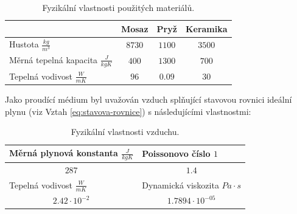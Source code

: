             \renewcommand{\arraystretch}{2}
            \begin{table}[ht!]
                \centering
                \caption{Fyzikální vlastnosti použitých materiálů.}
                \begin{tabular}{l|l|l|l}
                                                                                  & Mosaz                        & Pryž                        &  Keramika                      \\ \hline
                    Hustota $\unit{\frac{kg}{m^3}}$                               & \multicolumn{1}{c|}{$8730$}  & \multicolumn{1}{c|}{$1100$} & \multicolumn{1}{c}{$3500$}     \\ \hline
                    Měrná tepelná kapacita $\unit{\frac{J}{kg K}}$          & \multicolumn{1}{c|}{$400$}   & \multicolumn{1}{c|}{$1300$} & \multicolumn{1}{c}{$700$}      \\ \hline
                    Tepelná vodivost $\unit{\frac{W}{m K}}$                 & \multicolumn{1}{c|}{$96$}    & \multicolumn{1}{c|}{$0.09$} & \multicolumn{1}{c}{$30$}      
                \end{tabular}%
                \label{tab:materialy}
            \end{table}
            
            Jako proudící médium byl uvažován vzduch splňující stavovou rovnici ideální plynu (viz Vztah \ref{eq:stavova-rovnice}) s následujícími vlastnostmi:

		\begin{table}[ht!]
			\centering
            \caption{Fyzikální vlastnosti vzduchu.}
			\begin{tabular}{l|l}
				Měrná plynová konstanta $\unit{\frac{J}{kg K}}$ & Poissonovo číslo $\unit{1}$ \\ \hline
				\multicolumn{1}{c|}{$287$}                                                                        & \multicolumn{1}{c}{$1.4$}                \\ \hline
				Tepelná vodivost $\unit{\frac{W}{m K}}$ & Dynamická viskozita $\unit{Pa \cdot s}$ \\ \hline				
				\multicolumn{1}{c|}{$2.42 \cdot 10^{-2}$}                          &  \multicolumn{1}{c}{$1.7894 \cdot 10^{-05}$}     
			\end{tabular}%
			\label{tab:vzduch}
		\end{table}
            
